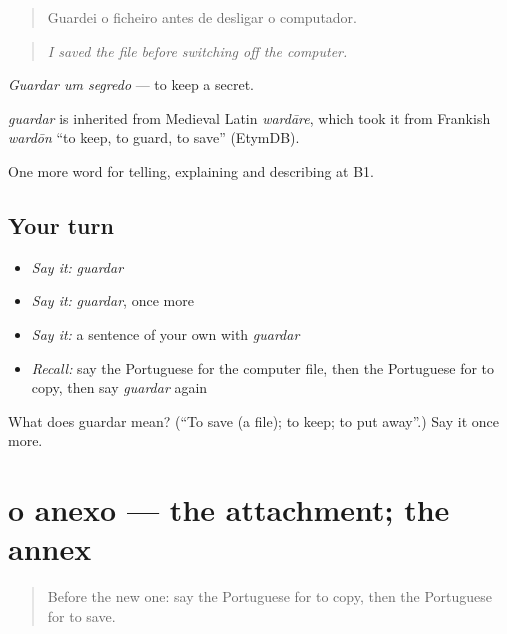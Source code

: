\begin{quote}
Guardei o ficheiro antes de desligar o computador.
\end{quote}

\begin{quote}
\emph{I saved the file before switching off the computer.}
\end{quote}

\emph{Guardar um segredo} — to keep a secret.

\begin{cousinweb}
\emph{guardar} is inherited from Medieval Latin \emph{wardāre}, which took it from Frankish \emph{wardōn} \textquotedblleft{}to keep, to guard, to save\textquotedblright{} (EtymDB).
\end{cousinweb}

\begin{grammarlens}[title={What you've built}]
One more word for telling, explaining and describing at B1.
\end{grammarlens}

\subsection*{Your turn}
\begin{itemize}
\raggedright
  \item \emph{Say it:} \emph{guardar}
  \item \emph{Say it:} \emph{guardar}, once more
  \item \emph{Say it:} a sentence of your own with \emph{guardar}
  \item \emph{Recall:} say the Portuguese for the computer file, then the Portuguese for to copy, then say \emph{guardar} again
\end{itemize}

\begin{tcolorbox}[breakable,colback=teal!4,colframe=teal!35!black,title={Before you move on}]
What does guardar mean? (\textquotedblleft{}To save (a file); to keep; to put away\textquotedblright{}.) Say it once more.
\end{tcolorbox}
\section[o anexo]{o anexo — the attachment; the annex}

\label{lesson:PT-C398-anexo}



\begin{quote}
Before the new one: say the Portuguese for to copy, then the Portuguese for to save.
\end{quote}

